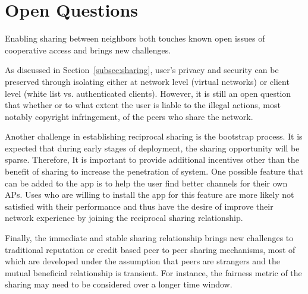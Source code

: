 \section{Open Questions}
\label{sec:challenges}

Enabling \wifi{} sharing between neighbors both touches known open issues of
cooperative \wifi{} access and brings new challenges.

As discussed in Section~\ref{subsec:sharing}, user's privacy and security can be
preserved through isolating either at network level (virtual networks) or client
level (white list vs. authenticated clients). However, it is still an open
question that whether or to what extent the user is liable to the illegal
actions, most notably copyright infringement, of the peers who share the
network.

Another challenge in establishing reciprocal \wifi{} sharing is the bootstrap
process. It is expected that during early stages of deployment, the sharing
opportunity will be sparse. Therefore, It is important to provide additional
incentives other than the benefit of \wifi{} sharing to increase the penetration
of system. One possible feature that can be added to the \wisefi{} app is to
help the user find better \wifi{} channels for their own APs. Uses who are
willing to install the app for this feature are more likely not satisfied with
their \wifi{} performance and thus have the desire of improve their network
experience by joining the reciprocal sharing relationship.

Finally, the immediate and stable sharing relationship brings new challenges to
traditional reputation or credit based peer to peer sharing mechanisms, most of
which are developed under the assumption that peers are strangers and the mutual
beneficial relationship is transient. For instance, the fairness metric of the
sharing may need to be considered over a longer time window.
